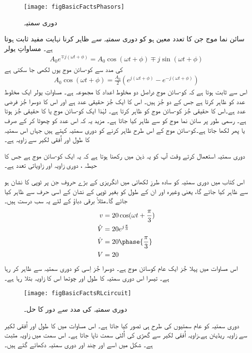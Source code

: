 \begin{figure}
\centering
\texttt{[image: figBasicFactsPhasors]}
\caption{دوری سمتیہ}
\label{شکل_حقائق_دوری_سمتیات}
\end{figure}
سائن نما موج جن کا تعدد معین ہو کو دوری سمتیہ سے ظاہر کرنا نہایت مفید ثابت ہوتا ہے۔ مساواتِ یولر
\begin{align}
A_0 e^{\mp j (\omega t + \phi)}=A_0 \cos (\omega t +\phi) \mp j \sin (\omega t+\phi)
\end{align}
کی مدد سے کو-سائن موج یوں لکھی جا سکتی ہے
\begin{align}
A_0 \cos (\omega t +\phi)=\frac{A_0}{2} \left(e^{j(\omega t +\phi)} -e^{-j(\omega t +\phi)}\right)
\end{align}
اس سے ثابت ہوتا ہے کہ کو-سائن موج دراصل دو مخلوط اعداد کا مجموعہ ہے۔ مساواتِ یولر ایک مخلوط عدد کو ظاہر کرتا ہے جس کے دو جُز ہیں۔ اس کا ایک جُز حقیقی عدد ہے اور اس کا دوسرا جُز فرضی عدد ہے۔اس کا حقیقی جُز کو-سائن موج کو ظاہر کرتا ہے۔ لہٰذا ایک کو-سائن موج   یا  کا حقیقی جُز ہوتا ہے۔ رسمی طور پر سائن نما موج کو  سے ظاہر کیا جاتا ہے۔ مزید یہ کہ اس عدد کو چھوٹا کر کے صرف  یا پھر  لکھا جاتا ہے۔کو-سائن موج کے اس طرح ظاہر کرنے کو دوری سمتیہ کہتے ہیں جہاں اس سمتیہ کا طول  اور اُفقی لکیر سے زاویہ  ہے۔

	 دوری سمتیہ استعمال کرتے وقت آپ کو یہ ذہن میں رکھنا ہوتا ہے کہ یہ ایک کو-سائن موج ہے جس کا حیطہ   ، دوری زاویہ  اور زاویاتی تعدد  ہے۔

اس کتاب میں دوری سمتیہ کو سادہ طرزِ لکھائی میں انگریزی کے بڑے حروف جن پر ٹوپی کا نشان ہو سے ظاہر کیا جائے گا، یعنی   وغیرہ اور ان کے طول کو بغیر ٹوپی کے نشان کے اسی حرف سے ظاہر کیا جائے گا۔مثلاً برقی دباؤ  کے لئے یہ سب درست ہیں۔
\begin{gather}
\begin{aligned}
v&=20 \cos (\omega t +\frac{\pi}{3})\\
\hat{V}&=20 e^{j \frac{\pi}{3}}\\
\hat{V}&=20 \phase{\frac{\pi}{3}}\\
V&=20
\end{aligned}
\end{gather}
اس مساوات میں پہلا جُز ایک عام کوسائن موج ہے۔ دوسرا جُز اِسی کو دوری سمتیہ سے ظاہر کر رہا ہے۔ تیسرا اس دوری سمتیہ کا طول اور چوتھا اس کا زاویہ بتلا رہا ہے۔
\begin{figure}
\centering
\texttt{[image: figBasicFactsRLcircuit]}
\caption{دوری سمتیہ کی مدد سے  دور کا حل۔}
\label{شکل_حقائق_دوری_سمتیہ_سے_دور_حل}
\end{figure}
	دوری سمتیہ کو عام سمتیوں کی طرح ہی تصور کیا جاتا ہے۔ اس مساوات میں  کا طول  اور اُفقی لکیر سے زاویہ   ریڈیئن ہے۔زاویہ اُفقی لکیر سے گھڑی کی اُلٹی سمت ناپا جاتا ہے۔ اس سمت میں زاویہ مثبت ہے۔ شکل  میں اسے اور چند اور دوری سمتیہ دکھائے گئے ہیں۔

